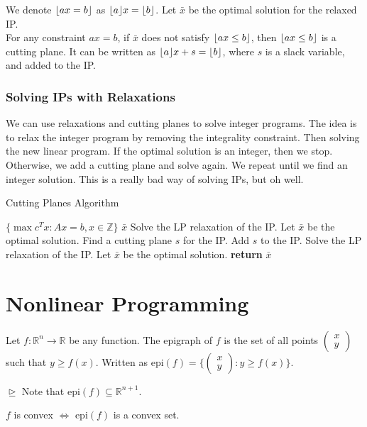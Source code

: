 \documentclass[a4paper]{report}
\newcommand{\m}[1]{\begin{pmatrix}
	#1
\end{pmatrix}}
\DeclarePairedDelimiter{\floor}{\lfloor}{\rfloor}
\begin{document}
	\begin{definition}
		We denote $\floor{ax = b}$ as $\floor{a}x = \floor{b}$. Let $\bar x$ be the
		optimal solution for the relaxed IP. \\ For any constraint $ax = b$, if
		$\bar x$ does not satisfy $\floor{ax \leq b}$, then $\floor{ax \leq b}$ is a
		cutting plane. It can be written as $\floor{a}x + s = \floor{b}$, where $s$ is
		a slack variable, and added to the IP.
	\end{definition}

	\subsection{Solving IPs with Relaxations}
	We can use relaxations and cutting planes to solve integer programs. The idea
	is to relax the integer program by removing the integrality constraint. Then solving
	the new linear program. If the optimal solution is an integer, then we stop.
	Otherwise, we add a cutting plane and solve again. We repeat until we find an
	integer solution. This is a really bad way of solving IPs, but oh well.

	\begin{algorithm}
		 \algrenewcommand{}
		\algrenewcommand{}
		\caption{Cutting Planes Algorithm}
		\label{alg:cut}
		\begin{algorithmic}
			[1] \Require $\{\max c^{T}x : Ax = b, x \in \mathbb{Z}\}$ \Ensure $\bar x$
			\State Solve the LP relaxation of the IP. Let $\bar x$ be the optimal
			solution.  \State Find a cutting plane $s$
			for the IP. \State Add $s$ to the IP. \State Solve the LP relaxation of
			the IP. Let $\bar x$ be the optimal solution. \EndWhile \State \textbf{return}
			$\bar x$
		\end{algorithmic}
	\end{algorithm}

	\chapter{Nonlinear Programming}

    \begin{definition}[Epigraphs]
        Let $f : \mathbb{R}^{n} \rightarrow \mathbb{R}$ be any function. The
        epigraph of $f$ is the set of all points $\m{x \\ y}$ such that $y \geq f(x)$.
        Written as $\text{epi}(f) = \Bigg\{\m{x \\ y} : y \geq f(x)\Bigg\}$. 
        
        $\trianglerighteq$ Note that $\text{epi}(f) \subseteq \mathbb{R}^{n+1}$.
        \begin{corollary}
            $f$ is convex $\iff$ $\text{epi}(f)$ is a convex set.
        \end{corollary}
    \end{definition}
\end{document}
